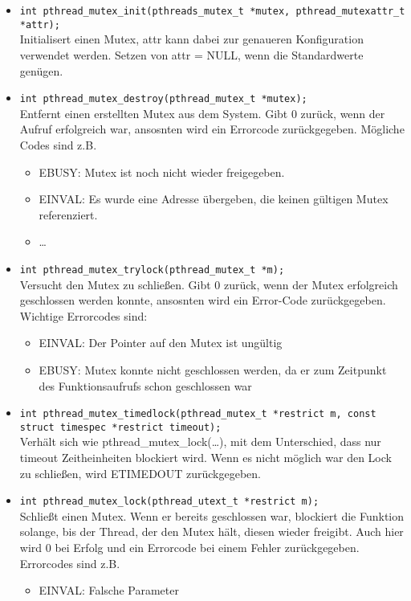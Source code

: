 \documentclass[11pt,a4paper]{article}
\begin{document}
\begin{itemize}
\item \lstinline$int pthread_mutex_init(pthreads_mutex_t *mutex, pthread_mutexattr_t *attr);$ \\
Initialisert einen Mutex, attr kann dabei zur genaueren Konfiguration verwendet werden. Setzen von attr = NULL, wenn die Standardwerte genügen. 

\item \lstinline$int pthread_mutex_destroy(pthread_mutex_t *mutex);$ \\
Entfernt einen erstellten Mutex aus dem System. Gibt 0 zurück, wenn der Aufruf erfolgreich war, ansosnten wird ein Errorcode zurückgegeben. Mögliche Codes sind z.B.
\begin{itemize}
	\item EBUSY: Mutex ist noch nicht wieder freigegeben.
	\item EINVAL: Es wurde eine Adresse übergeben, die keinen gültigen Mutex referenziert.
	\item \ldots
\end{itemize}

\item \lstinline$int pthread_mutex_trylock(pthread_mutex_t *m);$ \\
Versucht den Mutex zu schließen. Gibt 0 zurück, wenn der Mutex erfolgreich geschlossen werden konnte, ansosnten wird ein Error-Code zurückgegeben. Wichtige Errorcodes sind:
\begin{itemize}
	\item EINVAL: Der Pointer auf den Mutex ist ungültig
	\item EBUSY: Mutex konnte nicht geschlossen werden, da er zum Zeitpunkt des Funktionsaufrufs schon geschlossen war
\end{itemize}

\item \lstinline$int pthread_mutex_timedlock(pthread_mutex_t *restrict m, const struct timespec *restrict timeout);$ \\
Verhält sich wie pthread\_mutex\_lock(\ldots), mit dem Unterschied, dass nur timeout Zeitheinheiten blockiert wird. Wenn es nicht möglich war den Lock zu schließen, wird ETIMEDOUT zurückgegeben.

\item \lstinline$int pthread_mutex_lock(pthread_utext_t *restrict m);$ \\
Schließt einen Mutex. Wenn er bereits geschlossen war, blockiert die Funktion solange, bis der Thread, der den Mutex hält, diesen wieder freigibt. Auch hier wird 0 bei Erfolg und ein Errorcode bei einem Fehler zurückgegeben. Errorcodes sind z.B.
\begin{itemize}
	\item EINVAL: Falsche Parameter
\end{itemize}


\end{itemize}
\end{document}
